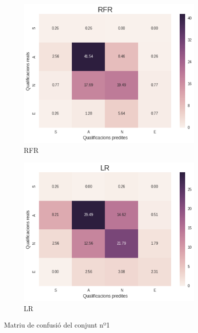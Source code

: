 \documentclass[12pt,a4paper,catalan]{article}
\begin{document}
\begin{figure}[h]
\centering
\begin{subfigure}{.48\textwidth}
  \centering
  \includegraphics[width=\linewidth]{img/heatmap_rfr_primer_segon.png}
  \caption{RFR}
\end{subfigure}
\begin{subfigure}{.48\textwidth}
  \centering
  \includegraphics[width=\linewidth]{img/heatmap_lr_primer_segon.png}
  \caption{LR}
\end{subfigure}
\caption{Matriu de confusió del conjunt nº1}
\label{fig:mctp}
\end{figure}
\end{document}
